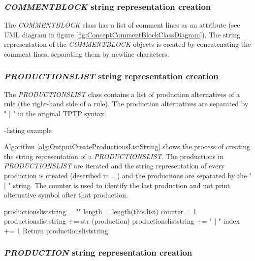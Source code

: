 \subsubsection{\textit{COMMENT\textunderscore BLOCK} string representation creation}
The \textit{COMMENT\textunderscore BLOCK} class has a list of comment lines as an attribute (see UML diagram in figure \ref{fig:ConceptCommentBlockClassDiagram}). The string representation of the \textit{COMMENT\textunderscore BLOCK} objects is created by concatenating the comment lines, separating them by newline characters.

\subsubsection{\textit{PRODUCTIONS\textunderscore LIST} string representation creation}
The \textit{PRODUCTIONS\textunderscore LIST} class contains a list of production alternatives of a rule (the right-hand side of a rule). The production alternatives are separated by " | " in the original \ac{TPTP} syntax.

-listing example

Algorithm \ref{alg:OutputCreateProductionsListString} shows the process of creating the string representation of a \textit{PRODUCTIONS\textunderscore LIST}. The productions in \textit{PRODUCTIONS\textunderscore LIST} are iterated and the string representation of every production is created (described in ...) and the productions are separated by the " | " string. The counter is used to identify the last production and not print alternative symbol after that production.

\begin{algorithm}[H]
\caption{\textit{PRODUCTIONS\textunderscore LIST} string creation}\label{alg:OutputCreateProductionsListString}
\begin{algorithmic}[1]
\State productions\textunderscore list\textunderscore string = ""
\State length = length(this.list)
\State counter = 1
	\State productions\textunderscore list\textunderscore string += str (production)
		\State productions\textunderscore list\textunderscore string += " | "
	\EndIf
	\State index += 1
\EndFor
\State Return \State productions\textunderscore list\textunderscore string
\end{algorithmic}
\end{algorithm}

\subsubsection{\textit{PRODUCTION} string representation creation}

